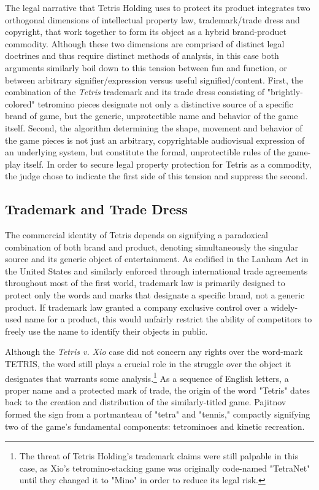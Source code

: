 The legal narrative that Tetris Holding uses to protect its product integrates two orthogonal dimensions of intellectual property law, trademark/trade dress and copyright, that work together to form its object as a hybrid brand-product commodity. Although these two dimensions are comprised of distinct legal doctrines and thus require distinct methods of analysis, in this case both arguments similarly boil down to this tension between fun and function, or between arbitrary signifier/expression versus useful signified/content. First, the combination of the \emph{Tetris} trademark and its trade dress consisting of "brightly-colored" tetromino pieces designate not only a distinctive source of a specific brand of game, but the generic, unprotectible name and behavior of the game itself. Second, the algorithm determining the shape, movement and behavior of the game pieces is not just an arbitrary, copyrightable audiovisual expression of an underlying system, but constitute the formal, unprotectible rules of the game-play itself. In order to secure legal property protection for Tetris as a commodity, the judge chose to indicate the first side of this tension and suppress the second.

\subsection*{Trademark and Trade Dress}
The commercial identity of Tetris depends on signifying a paradoxical combination of both brand and product, denoting simultaneously the singular source and its generic object of entertainment. As codified in the Lanham Act in the United States and similarly enforced through international trade agreements throughout most of the first world, trademark law is primarily designed to protect only the words and marks that designate a specific brand, not a generic product. If trademark law granted a company exclusive control over a widely-used name for a product, this would unfairly restrict the ability of competitors to freely use the name to identify their objects in public.

Although the \emph{Tetris v. Xio} case did not concern any rights over the word-mark \textsc{TETRIS}, the word still plays a crucial role in the struggle over the object it designates that warrants some analysis.\footnote{
  The threat of Tetris Holding's trademark claims were still palpable in this case, as Xio's tetromino-stacking game was originally code-named "TetraNet" until they changed it to "Mino" in order to reduce its legal risk.
}
As a sequence of English letters, a proper name and a protected mark of trade, the origin of the word "Tetris" dates back to the creation and distribution of the similarly-titled game. Pajitnov formed the sign from a portmanteau of "tetra" and "tennis," compactly signifying two of the game's fundamental components: tetrominoes and kinetic recreation.

